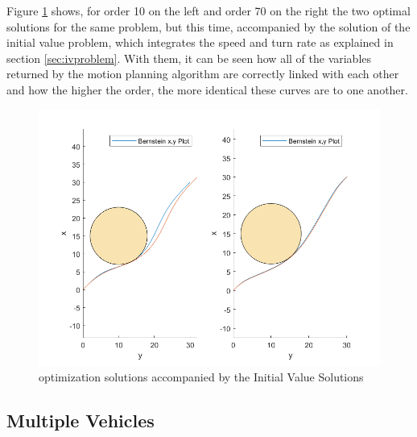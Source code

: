 \par Figure \ref{fig:ivpsoundness} shows, for order 10 on the left and order 70 on the right the two optimal solutions for the same problem, but this time, accompanied by the solution of the initial value problem, which integrates the speed and turn rate as explained in section \ref{sec:ivproblem}. With them, it can be seen how all of the variables returned by the motion planning algorithm are correctly linked with each other and how the higher the order, the more identical these curves are to one another.

\begin{figure}[h!]
\centering
\includegraphics[width=\textwidth]{Images/results/ivpsoundness.png}
\caption{optimization solutions accompanied by the Initial Value Solutions}
\label{fig:ivpsoundness}
\end{figure}

\subsection{Multiple Vehicles}


